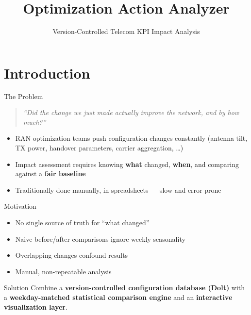 \documentclass[aspectratio=169]{beamer}
\title[Optimization Action Analyzer]{Optimization Action Analyzer}
\subtitle{Version-Controlled Telecom KPI Impact Analysis}
\author{}
\institute{}
\date{}
\begin{document}
\begin{frame}
    \titlepage
\end{frame}

\section{Introduction}

\begin{frame}{The Problem}
    \begin{quote}
        \emph{``Did the change we just made actually improve the network,
        and by how much?''}
    \end{quote}
    \vspace{0.5em}
    \begin{itemize}
        \item RAN optimization teams push configuration changes constantly
              (antenna tilt, TX power, handover parameters, carrier
              aggregation, \dots)
        \item Impact assessment requires knowing \textbf{what} changed,
              \textbf{when}, and comparing against a \textbf{fair
              baseline}
        \item Traditionally done manually, in spreadsheets --- slow and
              error-prone
    \end{itemize}
\end{frame}

\begin{frame}{Motivation}
    \begin{itemize}
        \item No single source of truth for ``what changed''
        \item Naive before/after comparisons ignore weekly seasonality
        \item Overlapping changes confound results
        \item Manual, non-repeatable analysis
    \end{itemize}
    \vspace{0.5em}
    \begin{block}{Solution}
        Combine a \textbf{version-controlled configuration database
        (Dolt)} with a \textbf{weekday-matched statistical comparison
        engine} and an \textbf{interactive visualization layer}.
    \end{block}
\end{frame}
\end{document}
